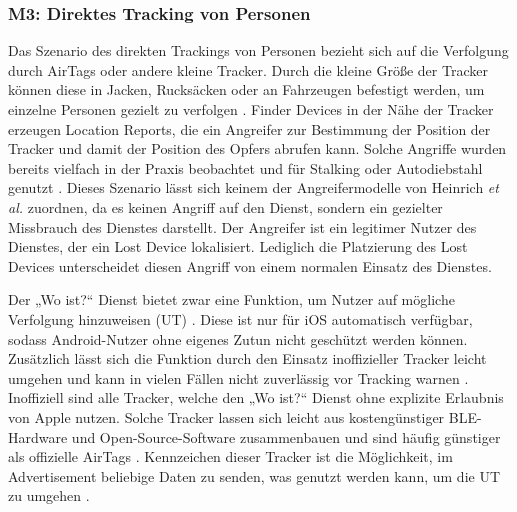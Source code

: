 
\subsubsection[M3]{M3: Direktes Tracking von Personen}
\label{missbrauch:3}
Das Szenario des direkten Trackings von Personen bezieht sich auf die Verfolgung durch AirTags oder andere kleine Tracker.
Durch die kleine Größe der Tracker können diese in Jacken, Rucksäcken oder an Fahrzeugen befestigt werden, um einzelne Personen gezielt zu verfolgen \cite{Roth_airtags}.
Finder Devices in der Nähe der Tracker erzeugen Location Reports, die ein Angreifer zur Bestimmung der Position der Tracker und damit der Position des Opfers abrufen kann.
Solche Angriffe wurden bereits vielfach in der Praxis beobachtet und für Stalking oder Autodiebstahl genutzt \cite{NYT_Airtags}.
Dieses Szenario lässt sich keinem der Angreifermodelle von Heinrich \textit{et al.} \cite{Heinrich_FindMy} zuordnen, da es keinen Angriff auf den Dienst, sondern ein gezielter Missbrauch des Dienstes darstellt.
Der Angreifer ist ein legitimer Nutzer des Dienstes, der ein Lost Device lokalisiert.
Lediglich die Platzierung des Lost Devices unterscheidet diesen Angriff von einem normalen Einsatz des Dienstes.

Der „Wo ist?“ Dienst bietet zwar eine Funktion, um Nutzer auf mögliche Verfolgung hinzuweisen (\ac{UT}) \cite{Apple_FindMySpec}.
Diese ist nur für iOS automatisch verfügbar, sodass Android-Nutzer ohne eigenes Zutun nicht geschützt werden können.
Zusätzlich lässt sich die Funktion durch den Einsatz inoffizieller Tracker leicht umgehen und kann in vielen Fällen nicht zuverlässig vor Tracking warnen \cite{Heinrich_AirGuard,Mayberry_Tracking}.
Inoffiziell sind alle Tracker, welche den „Wo ist?“ Dienst ohne explizite Erlaubnis von Apple nutzen.
Solche Tracker lassen sich leicht aus kostengünstiger \ac{BLE}-Hardware und Open-Source-Software zusammenbauen und sind häufig günstiger als offizielle AirTags \cite{Heinrich_OpenHaystack,Mayberry_Tracking}.
Kennzeichen dieser Tracker ist die Möglichkeit, im Advertisement beliebige Daten zu senden, was genutzt werden kann, um die \ac{UT} zu umgehen \cite{Mayberry_Tracking}.

